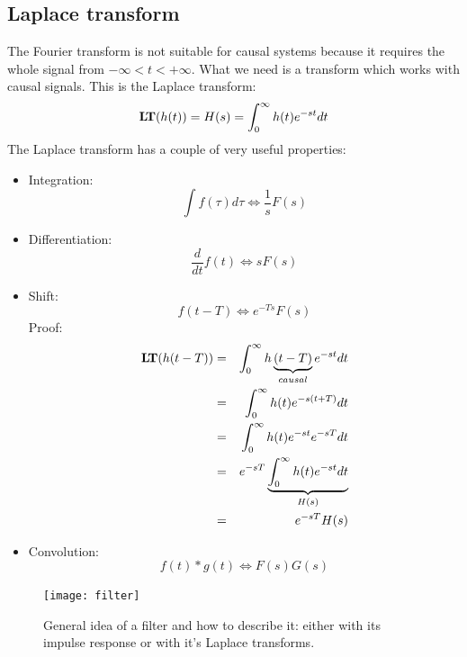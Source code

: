 \documentclass[12pt,a4paper]{article}
\def\lapl#1{{\mathrm{\bf L\!T}({#1})}}
\begin{document}
\subsection{Laplace transform}
The Fourier transform is not suitable for causal systems
because it requires the whole signal from $-\infty < t < +\infty$.
What we need is a transform which works with causal signals.
This is the Laplace transform:
\begin{equation} 
\lapl{h(t)} = H(s) = \int_{0}^{\infty} h(t) e^{-st} dt
\label{lapltrans}
\end{equation}
The Laplace transform has a couple of very useful properties:
\begin{itemize}
\item Integration: 
\begin{equation}
\int f(\tau) d\tau \Leftrightarrow \frac{1}{s} F(s)
\end{equation}
\item Differentiation:
\begin{equation}
\frac{d}{dt} f(t) \Leftrightarrow s F(s) 
\end{equation}
\item Shift:
\begin{equation}
f(t - T) \Leftrightarrow e^{-Ts} F(s)
\label{shiftOperation}
\end{equation}
Proof:
\begin{eqnarray}
\lapl{h(t - T)} & = &\int_{0}^{\infty} h\underbrace{(t - T)}_{causal} e^{-st} dt \\
& = & \int_{0}^{\infty} h(t) e^{-s(t + T)} dt \\
& = & \int_{0}^{\infty} h(t) e^{-st} e^{-sT} dt \\
& = & e^{-sT} \underbrace{\int_{0}^{\infty} h(t) e^{-st} dt}_{H(s)} \\
& = & e^{-sT} H(s)
\end{eqnarray}

\item Convolution:
\begin{equation} 
f(t) * g(t) \Leftrightarrow F(s) G(s)
\end{equation}
\end{itemize}




\begin{figure}[!hbt]
\begin{center}
\mbox{\texttt{[image: filter]}}
\end{center}
\caption{General idea of a filter and how to describe it:
either with its impulse response or with it's Laplace transforms.
\label{filter}}
\end{figure}
\end{document}
